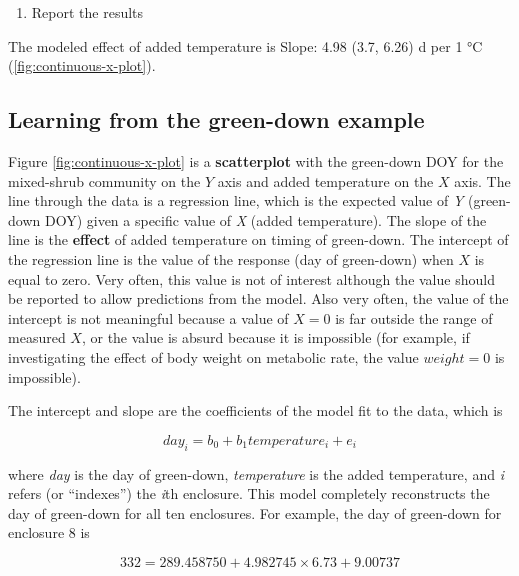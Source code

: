 \documentclass[]{book}
\providecommand{\tightlist}{%
  \setlength{\itemsep}{0pt}\setlength{\parskip}{0pt}}
\begin{document}
\begin{enumerate}
\def\labelenumi{\arabic{enumi}.}
\setcounter{enumi}{6}
\tightlist
\item
  Report the results
\end{enumerate}

The modeled effect of added temperature is Slope: 4.98 (3.7, 6.26) d per 1 °C (\ref{fig:continuous-x-plot}).

\hypertarget{learning-from-the-green-down-example}{%
\subsection{Learning from the green-down example}\label{learning-from-the-green-down-example}}

Figure \ref{fig:continuous-x-plot} is a \textbf{scatterplot} with the green-down DOY for the mixed-shrub community on the \(Y\) axis and added temperature on the \(X\) axis. The line through the data is a regression line, which is the expected value of \emph{Y} (green-down DOY) given a specific value of \emph{X} (added temperature). The slope of the line is the \textbf{effect} of added temperature on timing of green-down. The intercept of the regression line is the value of the response (day of green-down) when \(X\) is equal to zero. Very often, this value is not of interest although the value should be reported to allow predictions from the model. Also very often, the value of the intercept is not meaningful because a value of \(X = 0\) is far outside the range of measured \(X\), or the value is absurd because it is impossible (for example, if investigating the effect of body weight on metabolic rate, the value \(weight = 0\) is impossible).

The intercept and slope are the coefficients of the model fit to the data, which is

\begin{equation}
day_i = b_0 + b_1 temperature_i + e_i
\label{eq:continuous-x-fit}
\end{equation}

where \emph{day} is the day of green-down, \emph{temperature} is the added temperature, and \emph{i} refers (or ``indexes'') the \emph{i}th enclosure. This model completely reconstructs the day of green-down for all ten enclosures. For example, the day of green-down for enclosure 8 is

\begin{equation}
332 = 289.458750 + 4.982745 \times 6.73 + 9.00737
\end{equation}
\end{document}
